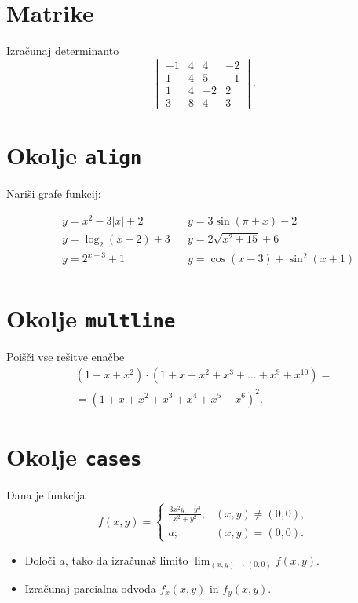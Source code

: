 \documentclass[a4paper,12pt]{article}
\begin{document}
\section*{Matrike}
Izračunaj determinanto
\[
\begin{vmatrix}
   -1 & 4 & 4 & -2 \\
   1 & 4 & 5 & -1 \\
   1 & 4 & -2 & 2 \\
   3 & 8 & 4 & 3 
\end{vmatrix}.
\]


\section*{Okolje \texttt{align}}
Nariši grafe funkcij:

\begin{align*}
&y = x^2 - 3|x| + 2    &&y = 3 \sin(\pi+x) - 2 \\
&y = \log_2(x-2) + 3   &&y = 2 \sqrt{x^2+15} + 6 \\
&y = 2^{x-3} + 1       &&y = \cos(x-3) + \sin^2(x+1) \\
\end{align*}


\section*{Okolje \texttt{multline}}
Poišči vse rešitve enačbe
\begin{multline*}
(1+x+x^2) \cdot (1+x+x^2+x^3+\ldots+x^9+x^{10}) = \\
=(1+x+x^2+x^3+x^4+x^5+x^6)^2.
\end{multline*}

\section*{Okolje \texttt{cases}}
Dana je funkcija
\[f(x,y)= \begin{cases}
    \frac{3x^2y-y^3}{x^2+y^2}; &(x,y) \neq(0,0), \\
    a; & (x,y)=(0,0).
\end{cases}
\]

\begin{itemize}
\item Določi \(a\), tako da izračunaš limito \( \lim_{(x,y)\to(0,0)} f(x,y) \).
\item Izračunaj parcialna odvoda \(f_x(x,y)\) in \(f_y(x,y)\).
\end{itemize}
\end{document}

